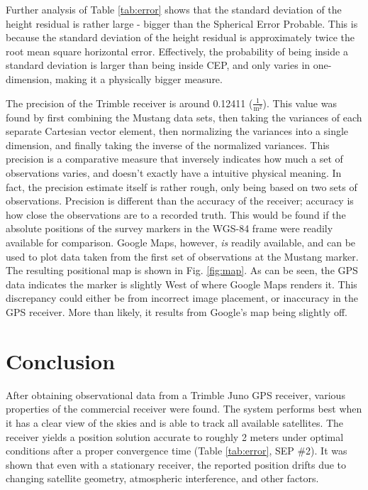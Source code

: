 \documentclass[11pt]{article}
\begin{document}
Further analysis of Table \ref{tab:error} shows that the standard deviation of the height residual is rather large - bigger than the Spherical Error Probable. This is because the standard deviation of the height residual is approximately twice the root mean square horizontal error. \cite{gps} Effectively, the probability of being inside a standard deviation is larger than being inside CEP, and only varies in one-dimension, making it a physically bigger measure.

The precision of the Trimble receiver is around 0.12411 ($\frac{1}{\text{m}^2}$). This value was found by first combining the Mustang data sets, then taking the variances of each separate Cartesian vector element, then normalizing the variances into a single dimension, and finally taking the inverse of the normalized variances. This precision is a comparative measure that inversely indicates how much a set of observations varies, and doesn't exactly have a intuitive physical meaning. In fact, the precision estimate itself is rather rough, only being based on two sets of observations. Precision is different than the accuracy of the receiver; accuracy is how close the observations are to a recorded truth. This would be found if the absolute positions of the survey markers in the WGS-84 frame were readily available for comparison. Google Maps, however, \textit{is} readily available, and can be used to plot data taken from the first set of observations at the Mustang marker. The resulting positional map is shown in Fig. \ref{fig:map}. As can be seen, the GPS data indicates the marker is slightly West of where Google Maps renders it. This discrepancy could either be from incorrect image placement, or inaccuracy in the GPS receiver. More than likely, it results from Google's map being slightly off.



\section{Conclusion}
After obtaining observational data from a Trimble Juno GPS receiver, various properties of the commercial receiver were found. The system performs best when it has a clear view of the skies and is able to track all available satellites. The receiver yields a position solution accurate to roughly 2 meters under optimal conditions after a proper convergence time (Table \ref{tab:error}, SEP \#2). It was shown that even with a stationary receiver, the reported position drifts due to changing satellite geometry, atmospheric interference, and other factors.
\end{document}
